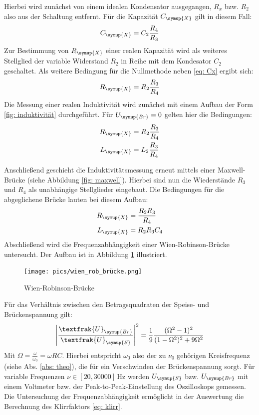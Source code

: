Hierbei wird zunächst von einem idealen Kondensator ausgegangen, $R_x$ bzw. $R_2$ also aus der Schaltung entfernt. Für die
Kapazität $C_{\symup{X}}$ gilt in diesem Fall:
\begin{equation}
  C_{\symup{X}} = C_2 \frac{R_4}{R_3}
  \label{eq: Cx}
\end{equation}
Zur Bestimmung von $R_{\symup{X}}$ einer realen Kapazität wird als weiteres Stellglied der variable Widerstand $R_2$ in Reihe mit dem Kondesator $C_2$
geschaltet. Als weitere Bedingung für die Nullmethode neben \eqref{eq: Cx} ergibt sich:
\begin{equation}
  R_{\symup{X}} = R_2\frac{R_3}{R_4}
  \label{eq: Rx}
\end{equation}
Die Messung einer realen Induktivität wird zunächst mit einem Aufbau der Form \ref{fig: induktivität} durchgeführt.
Für $U_{\symup{Br}} = 0$ gelten hier die Bedingungen:
\begin{align}
  \begin{aligned}
    R_{\symup{X}} &= R_2\frac{R_3}{R_4} \\
    L_{\symup{X}} &= L_2\frac{R_3}{R_4}
  \end{aligned}
  \label{eq: Lx}
\end{align}

Anschließend geschieht die Induktivitätsmessung erneut mittels einer Maxwell-Brücke (siehe Abbildung \ref{fig: maxwell}).
Hierbei sind nun die Wiederstände $R_3$ und $R_4$ als unabhängige Stellglieder eingebaut. Die Bedingungen für die abgeglichene Brücke lauten
bei diesem Aufbau:
\begin{align}
  \begin{aligned}
    R_{\symup{X}} &=\frac{R_2 R_3}{R_4} \\
    L_{\symup{X}} &= R_2 R_3 C_4
  \end{aligned}
  \label{eq: Lx_maxwell}
\end{align}
Abschließend wird die Frequenzabhängigkeit einer Wien-Robinson-Brücke untersucht. Der Aufbau ist in Abbildung
 \ref{fig: wienrob} illustriert.
\begin{figure}
  \centering
  \texttt{[image: pics/wien\_rob\_brücke.png]}
  \caption{Wien-Robinson-Brücke\cite{anleitung302}}
  \label{fig: wienrob}
\end{figure}
Für das Verhältnis zwischen den Betragsquadraten der Speise- und Brückenspannung gilt:
\begin{equation}
\label{eq:wien_theo}
  \left| \frac{\textfrak{U}_{\symup{Br}}}{\textfrak{U}_{\symup{S}}}\right|^2 = \frac{1}{9} \frac{(\Omega^2 - 1)^2 }{(1 - \Omega ^2)^2 + 9 \Omega ^2}
\end{equation}
Mit $\Omega = \frac{\omega}{\omega_0} = \omega R C$. Hierbei entspricht $\omega_0$ also der zu $\nu_0$ gehörigen Kreisfrequenz (siehe Abs. \ref{abs: theo}), die
für ein Verschwinden der Brückenspannung sorgt. Für variable Frequenzen $\nu \in [20, \num{30000}]\,\si{\hertz}$ werden $U_{\symup{S}}$ bzw. $U_{\symup{Br}}$ mit einem
Voltmeter bzw. der Peak-to-Peak-Einstellung des Oszilloskops gemessen. Die Untersuchung der Frequenzabhängigkeit
 ermöglicht in der Auswertung die Berechnung des Klirrfaktors \eqref{eq: klirr}.
